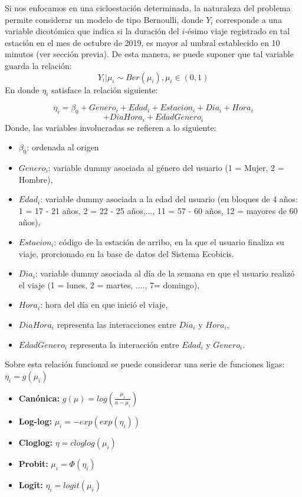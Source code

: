 \documentclass[9pt,twocolumn,twoside]{ilcss}
\begin{document}
Si nos enfocamos en una cicloestación determinada, la naturaleza del problema permite considerar un modelo de tipo Bernoulli, donde $Y_i$ corresponde a una variable dicotómica que indica si la duración del $i$-ésimo viaje registrado en tal estación en el mes de octubre de 2019, es mayor al umbral establecido en 10 minutos (ver sección previa). De esta manera, se puede suponer que tal variable guarda la relación:
$$Y_i|\mu_i \sim  Ber (\mu_i), \mu_i \in (0,1)$$En donde $\eta_i$ satisface la relación siguiente:

$$\eta_i = \beta_0+Genero_i+Edad_i+Estacion_i+Dia_i+Hora_i$$
 $$+DiaHora_i+EdadGenero_i$$
\newline
Donde, las variables involucradas se refieren a lo siguiente:
\begin{itemize}
    \item $\beta_0$: ordenada al origen
	\item $Genero_i$: variable dummy asociada al género del usuario (1 = Mujer, 2 = Hombre),
	\item $Edad_i$: variable dummy asociada a la edad del usuario (en bloques de 4 años: 1 = 17 - 21 años, 2 = 22 - 25 años,..., 11 = 57 - 60 años, 12 = mayores de 60 años),
	\item $Estacion_i$: código de la estación de arribo, en la que el usuario finaliza su viaje, prorcionado en la base de datos del Sistema Ecobicis.
	\item $Dia_i$: variable dummy asociada al día de la semana en que el usuario realizó el viaje (1 = lunes, 2 = martes, ...., 7= domingo),
	\item $Hora_i$: hora del día en que inició el viaje,
	\item $DiaHora_i$ representa las interacciones entre $Dia_i$ y $Hora_i$, 
	\item $EdadGenero_i$ representa la interacción entre $Edad_i$ y $Genero_i$.
\end{itemize}

Sobre esta relación funcional se puede considerar una serie de funciones ligas:
$\eta_i = g(\mu_i)$
\begin{itemize}
	\item \textbf{Canónica:} $g(\mu)= log (\frac{\mu_i}{a-\mu_i})$
	\item \textbf{Log-log:} $\mu_i = -exp(exp(\eta_i))$
	\item \textbf{Cloglog:} $\eta = cloglog(\mu_i)$	
    \item  \textbf{Probit:}	$\mu_i = \Phi(\eta_i)$
	\item \textbf{Logit:} $\eta_i = logit (\mu_i)$
\end{itemize}
\end{document}
